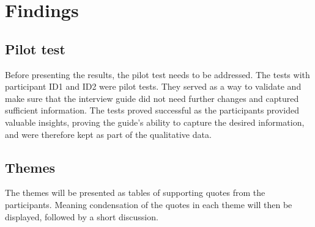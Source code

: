 \section{Findings}
\subsection{Pilot test}
Before presenting the results, the pilot test needs to be addressed. The tests with participant ID1 and ID2  were pilot tests. They served as a way to validate and make sure that the interview guide did not need further changes and captured sufficient information. The tests proved successful as the participants provided valuable insights, proving the guide's ability to capture the desired information, and were therefore kept as part of the qualitative data.

\subsection{Themes} \label{Themes}
The themes will be presented as tables of supporting quotes from the participants. Meaning condensation of the quotes in each theme will then be displayed, followed by a short discussion.

